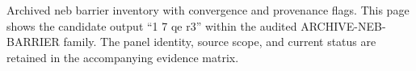 Archived neb barrier inventory with convergence and provenance flags. This page shows the candidate output ``1 7 qe r3'' within the audited ARCHIVE-NEB-BARRIER family. The panel identity, source scope, and current status are retained in the accompanying evidence matrix.
